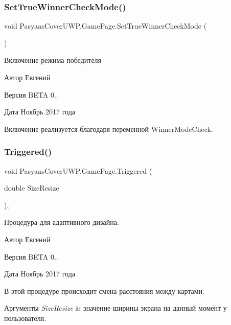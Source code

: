 \subsubsection{\texorpdfstring{Set\+True\+Winner\+Check\+Mode()}{SetTrueWinnerCheckMode()}}
{\footnotesize\ttfamily void Pasyans\+Cover\+U\+W\+P.\+Game\+Page.\+Set\+True\+Winner\+Check\+Mode (\begin{DoxyParamCaption}{ }\end{DoxyParamCaption})\hspace{0.3cm}{\ttfamily [inline]}}



Включение режима победителя 

\begin{DoxyAuthor}{Автор}
Евгений 
\end{DoxyAuthor}
\begin{DoxyVersion}{Версия}
B\+E\+TA 0.. 
\end{DoxyVersion}
\begin{DoxyDate}{Дата}
Ноябрь 2017 года
\end{DoxyDate}
Включение реализуется благодаря переменной Winner\+Mode\+Check. \mbox{\label{class_pasyans_cover_u_w_p_1_1_game_page_ab96dd33188b7ebb2a6f40110fe2d4cb5}} 
\subsubsection{\texorpdfstring{Triggered()}{Triggered()}}
{\footnotesize\ttfamily void Pasyans\+Cover\+U\+W\+P.\+Game\+Page.\+Triggered (\begin{DoxyParamCaption}\item[{double}]{Size\+Resize }\end{DoxyParamCaption})\hspace{0.3cm}{\ttfamily [inline]}, {\ttfamily [private]}}



Процедура для адаптивного дизайна. 

\begin{DoxyAuthor}{Автор}
Евгений 
\end{DoxyAuthor}
\begin{DoxyVersion}{Версия}
B\+E\+TA 0.. 
\end{DoxyVersion}
\begin{DoxyDate}{Дата}
Ноябрь 2017 года
\end{DoxyDate}
В этой процедуре происходит смена расстояния между картами. 
\begin{DoxyParams}{Аргументы}
{\em Size\+Resize} & значение ширины экрана на данный момент у пользователя. \\
\hline
\end{DoxyParams}


